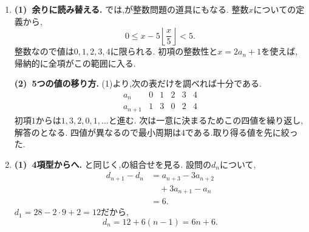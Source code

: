 \begin{enumerate}[label=\textbf{問\arabic*.},leftmargin=3.8em,format=\bookitemlink{practice-special}{solution}{problem}]
    \smallskip
    \textbf{(2)~和を個数として読む.}
    $x=k$のとき,指定範囲の整数$y$は$1$から$\lfloor\frac{k}{3}\rfloor$まである.
    $k=1,\ldots,n$について足せば,(1)の和に一致する.
    群ごとに値と項数を掛けて足す方法と,格子点の個数を数える方法は,同じ和の二つの見方である.
  \item \textbf{(1)~余りに読み替える.}
    では,が整数問題の道具にもなる.
    整数$x$についての定義から,
    \[
      0\le x-5\left\lfloor\frac{x}{5}\right\rfloor<5.
    \]
    整数なので値は$0,1,2,3,4$に限られる.
    初項の整数性と$x=2a_n+1$を使えば,帰納的に全項がこの範囲に入る.

    \smallskip
    \textbf{(2)~5つの値の移り方.}
    (1)より,次の表だけを調べれば十分である.
    \[
      \begin{array}{c|rrrrr}
        a_n&0&1&2&3&4\\ \hline
        a_{n+1}&1&3&0&2&4
      \end{array}
    \]
    初項$1$からは$1,3,2,0,1,\ldots$と進む.
    次は一意に決まるためこの四値を繰り返し,解答のとなる.
    四値が異なるので最小周期は$4$である.取り得る値を先に絞った.
  \item \textbf{(1)~4項型からへ.}
    と同じく,の組合せを見る.
    設問の$d_n$について,
    \begin{align*}
      d_{n+1}-d_n
      &=a_{n+3}-3a_{n+2}\\
      &\quad+3a_{n+1}-a_n\\
      &=6.
    \end{align*}
    $d_1=28-2\cdot9+2=12$だから,
    \[
      d_n=12+6(n-1)=6n+6.
    \]


\end{enumerate}
